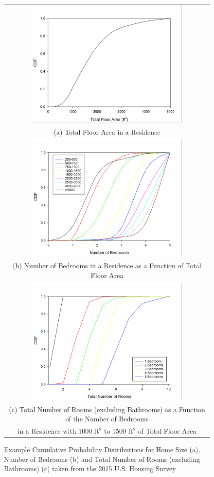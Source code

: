 \documentclass[12pt,twoside]{book}
\begin{document}
\begin{figure}[p]
\begin{tabular*}{\textwidth}{c}
\includegraphics[height=2.5in]{FIGURES/Total_Floor_Area} \\
(a) Total Floor Area in a Residence \\
\includegraphics[height=2.5in]{FIGURES/Number_of_Bedrooms} \\
(b) Number of Bedrooms in a Residence as a Function of Total Floor Area \\
\includegraphics[height=2.5in]{FIGURES/Total_Rooms} \\
(c) Total Number of Rooms (excluding Bathrooms) as a Function of the Number of Bedrooms  \\
in a Residence with 1000 ft$^2$ to 1500 ft$^2$ of Total Floor Area  \\
\end{tabular*}
\caption[Cumulative Probability Distributions for Home Size, Number of Bedrooms and Total Number of Rooms]
{Example Cumulative Probability Distributions for Home Size (a), Number of Bedrooms (b) and Total Number of Rooms (excluding Bathrooms) (c) taken from the 2015 U.S. Housing Survey \cite{AHS2015}}
\label{sample_room_distribution}
\end{figure}
\end{document}
